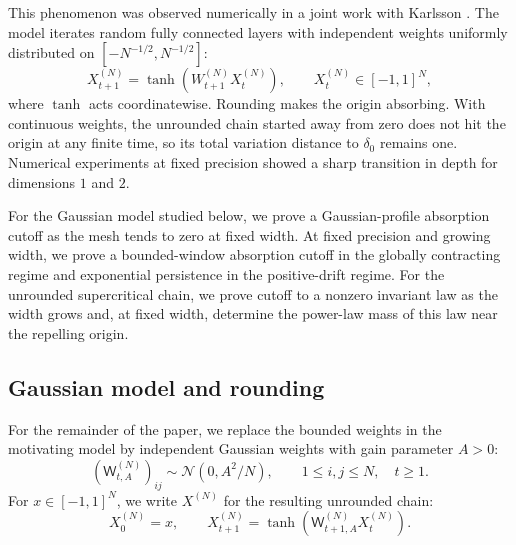 \documentclass[11pt,reqno,a4paper]{article}
\begin{document}
This phenomenon was observed numerically in a joint work with Karlsson
\cite{avelin-karlsson2022}. The model iterates random fully connected layers
with independent weights uniformly distributed on
$[-N^{-1/2},N^{-1/2}]$:
\begin{equation}\label{eq:intro-network}
  X_{t+1}^{(N)}
  =
  \tanh\left(W_{t+1}^{(N)}X_t^{(N)}\right),
  \qquad
  X_t^{(N)}\in[-1,1]^N,
\end{equation}
where $\tanh$ acts coordinatewise. Rounding makes the origin absorbing. With
continuous weights, the unrounded chain started away from zero does not hit the
origin at any finite time, so its total variation distance to $\delta_0$ remains
one. Numerical experiments at fixed precision showed a sharp transition in
depth for dimensions $1$ and $2$.

For the Gaussian model studied below, we prove a Gaussian-profile absorption
cutoff as the mesh tends to zero at fixed width. At fixed precision and growing
width, we prove a bounded-window absorption cutoff in the globally contracting
regime and exponential persistence in the positive-drift regime. For the
unrounded supercritical chain, we prove cutoff to a nonzero invariant law as the
width grows and, at fixed width, determine the power-law mass of this law near
the repelling origin.

\subsection{Gaussian model and rounding}
\label{subsec:intro-model}

For the remainder of the paper, we replace the bounded weights in the
motivating model by independent Gaussian weights with gain parameter $A>0$:
\begin{equation}\label{eq:intro-gaussian-weights}
  (\mathsf W_{t,A}^{(N)})_{ij}
  \sim
  \mathcal N(0,A^2/N),
  \qquad 1\leq i,j\leq N,\quad t\geq1.
\end{equation}
For $x\in[-1,1]^N$, we write $X^{(N)}$ for the resulting unrounded chain:
\begin{equation}\label{eq:intro-gaussian-chain}
  X_0^{(N)}=x,
  \qquad
  X_{t+1}^{(N)}
  =
  \tanh\left(\mathsf W_{t+1,A}^{(N)}X_t^{(N)}\right).
\end{equation}
\end{document}
